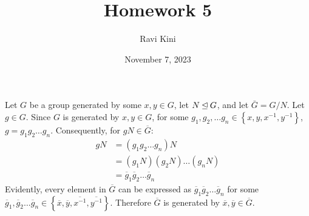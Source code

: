 \documentclass{article}
\title{Homework 5}
\author{Ravi Kini}
\date{November 7, 2023}
\begin{document}
\maketitle

\problem
Let $G$ be a group generated by some $x, y \in G$, let $N \unlhd G$, and let $\bar G = G/N$. Let $g \in G$. Since $G$ is generated by $x, y \in G$, for some $g_1, g_2, \ldots g_n \in \left\{x, y, x^{-1}, y^{-1}\right\}$, $g = g_1g_2\ldots g_n$. Consequently, for $gN \in \overline{G}$:
\begin{equation}
    \begin{split}
        gN & = \left(g_1g_2\ldots g_n\right)N \\
        & = \left(g_1N\right)\left(g_2N\right)\ldots\left(g_nN\right) \\
        & = \overline{g}_1\overline{g}_2\ldots\overline{g}_n
    \end{split}
\end{equation}
Evidently, every element in $\overline{G}$ can be expressed as $\overline{g}_1\overline{g}_2\ldots\overline{g}_n$ for some $\overline{g}_1, \overline{g}_2\ldots \overline{g}_n \in \left\{\overline{x}, \overline{y}, \overline{x^{-1}}, \overline{y^{-1}}\right\}$. Therefore $\overline{G}$ is generated by $\overline{x}, \overline{y} \in \overline{G}$.

\clearpage
\end{document}
